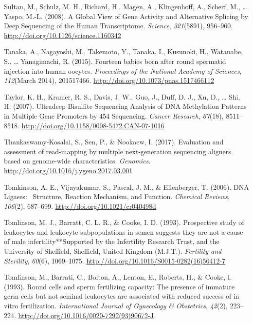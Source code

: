 \documentclass[12pt,twoside]{reedthesis}
\theoremstyle{definition}
\theoremstyle{definition}
\theoremstyle{remark}
\begin{document}
  \hypertarget{ref-Sultan2008}{}
  Sultan, M., Schulz, M. H., Richard, H., Magen, A., Klingenhoff, A.,
  Scherf, M., \ldots{} Yaspo, M.-L. (2008). A Global View of Gene Activity
  and Alternative Splicing by Deep Sequencing of the Human Transcriptome.
  \emph{Science}, \emph{321}(5891), 956--960.
  \url{http://doi.org/10.1126/science.1160342}
  
  \hypertarget{ref-Tanaka2015}{}
  Tanaka, A., Nagayoshi, M., Takemoto, Y., Tanaka, I., Kusunoki, H.,
  Watanabe, S., \ldots{} Yanagimachi, R. (2015). Fourteen babies born
  after round spermatid injection into human oocytes. \emph{Proceedings of
  the National Academy of Sciences}, \emph{112}(March 2014), 201517466.
  \url{http://doi.org/10.1073/pnas.1517466112}
  
  \hypertarget{ref-Taylor2007}{}
  Taylor, K. H., Kramer, R. S., Davis, J. W., Guo, J., Duff, D. J., Xu,
  D., \ldots{} Shi, H. (2007). Ultradeep Bisulfite Sequencing Analysis of
  DNA Methylation Patterns in Multiple Gene Promoters by 454 Sequencing.
  \emph{Cancer Research}, \emph{67}(18), 8511--8518.
  \url{http://doi.org/10.1158/0008-5472.CAN-07-1016}
  
  \hypertarget{ref-Thankaswamy-Kosalai2017}{}
  Thankaswamy-Kosalai, S., Sen, P., \& Nookaew, I. (2017). Evaluation and
  assessment of read-mapping by multiple next-generation sequencing
  aligners based on genome-wide characteristics. \emph{Genomics}.
  \url{http://doi.org/10.1016/j.ygeno.2017.03.001}
  
  \hypertarget{ref-Tomkinson2006}{}
  Tomkinson, A. E., Vijayakumar, S., Pascal, J. M., \& Ellenberger, T.
  (2006). DNA Ligases:~ Structure, Reaction Mechanism, and Function.
  \emph{Chemical Reviews}, \emph{106}(2), 687--699.
  \url{http://doi.org/10.1021/cr040498d}
  
  \hypertarget{ref-Tomlinson1993}{}
  Tomlinson, M. J., Barratt, C. L. R., \& Cooke, I. D. (1993). Prospective
  study of leukocytes and leukocyte subpopulations in semen suggests they
  are not a cause of male infertility**Supported by the Infertility
  Research Trust, and the University of Sheffield, Sheffield, United
  Kingdom (M.J.T.). \emph{Fertility and Sterility}, \emph{60}(6),
  1069--1075. \url{http://doi.org/10.1016/S0015-0282(16)56412-7}
  
  \hypertarget{ref-Tomlinson1993a}{}
  Tomlinson, M., Barrati, C., Bolton, A., Lenton, E., Roberts, H., \&
  Cooke, I. (1993). Round cells and sperm fertilizing capacity: The
  presence of immature germ cells but not seminal leukocytes are
  associated with reduced success of in vitro fertilization.
  \emph{International Journal of Gynecology \& Obstetrics}, \emph{42}(2),
  223--224. \url{http://doi.org/10.1016/0020-7292(93)90672-J}
  
\end{document}
